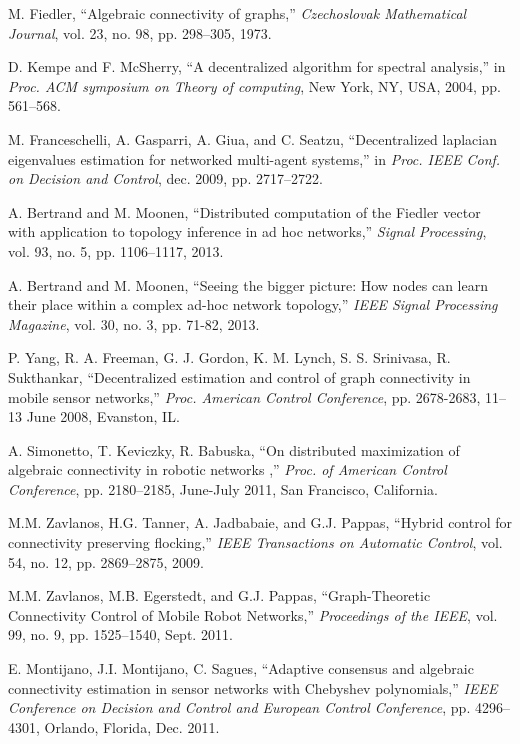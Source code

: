\documentclass[10pt,twocolumn]{IEEEtran}
\begin{document}
\begin{thebibliography}{1}
M. Fiedler, ``Algebraic connectivity of graphs,'' {\it Czechoslovak Mathematical Journal}, vol. 23, no. 98, pp. 298--305, 1973.




D. Kempe and F. McSherry, ``A decentralized algorithm for spectral analysis,'' in {\it Proc. ACM symposium on Theory of computing}, New York, NY, USA, 2004, pp. 561--568.

M. Franceschelli, A. Gasparri, A. Giua, and C. Seatzu, ``Decentralized laplacian eigenvalues estimation for networked multi-agent systems,'' in {\it Proc. IEEE Conf. on Decision and Control}, dec. 2009, pp. 2717--2722.

A. Bertrand and M. Moonen, ``Distributed computation of the Fiedler vector with application to topology inference in ad hoc networks,'' {\it Signal Processing}, vol. 93, no. 5, pp. 1106--1117, 2013.

A. Bertrand and M. Moonen, ``Seeing the bigger picture: How nodes can learn their place within a complex ad-hoc network topology,'' {\it IEEE Signal Processing Magazine}, vol. 30, no. 3, pp. 71-82, 2013.



P. Yang, R. A. Freeman, G. J. Gordon, K. M. Lynch, S. S. Srinivasa, R. Sukthankar, ``Decentralized estimation and control of graph connectivity in mobile sensor networks,'' {\it Proc. American Control Conference}, pp. 2678-2683, 11--13 June 2008, Evanston, IL.

A. Simonetto, T. Keviczky, R. Babuska, ``On distributed maximization of algebraic connectivity in robotic networks
,'' {\it  Proc. of American Control Conference}, pp. 2180--2185, June-July 2011, San Francisco, California.

M.M. Zavlanos, H.G. Tanner, A. Jadbabaie, and G.J. Pappas, ``Hybrid control for connectivity preserving flocking,'' {\it IEEE Transactions on Automatic Control}, vol. 54, no. 12, pp. 2869--2875, 2009.

M.M. Zavlanos, M.B. Egerstedt, and G.J. Pappas, ``Graph-Theoretic Connectivity Control of Mobile Robot Networks,'' {\it Proceedings of the IEEE}, vol. 99, no. 9, pp. 1525--1540, Sept. 2011.

E. Montijano, J.I. Montijano, C. Sagues, ``Adaptive consensus and algebraic connectivity estimation in sensor networks with Chebyshev polynomials,'' {\it IEEE Conference on Decision and Control and European Control Conference}, pp. 4296--4301, Orlando, Florida, Dec. 2011.


\end{thebibliography}
\end{document}
